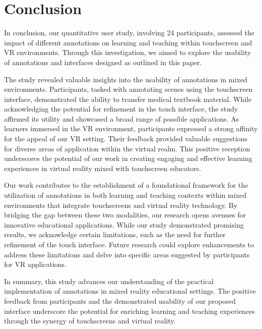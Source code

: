 \section{Conclusion}
In conclusion, our quantitative user study, involving 24 participants, assessed the impact of different annotations on learning and teaching within touchscreen and VR environments. Through this investigation, we aimed to explore the usability of annotations and interfaces designed as outlined in this paper.

The study revealed valuable insights into the usability of annotations in mixed environments. Participants, tasked with annotating scenes using the touchscreen interface, demonstrated the ability to transfer medical textbook material. While acknowledging the potential for refinement in the touch interface, the study affirmed its utility and showcased a broad range of possible applications. As learners immersed in the VR environment, participants expressed a strong affinity for the appeal of our VR setting. Their feedback provided valuable suggestions for diverse areas of application within the virtual realm. This positive reception underscores the potential of our work in creating engaging and effective learning experiences in virtual reality mixed with touchscreen educators.

Our work contributes to the establishment of a foundational framework for the utilization of annotations in both learning and teaching contexts within mixed environments that integrate touchscreens and virtual reality technology. By bridging the gap between these two modalities, our research opens avenues for innovative educational applications. While our study demonstrated promising results, we acknowledge certain limitations, such as the need for further refinement of the touch interface. Future research could explore enhancements to address these limitations and delve into specific areas suggested by participants for VR applications. 

In summary, this study advances our understanding of the practical implementation of annotations in mixed reality educational settings. The positive feedback from participants and the demonstrated usability of our proposed interface underscore the potential for enriching learning and teaching experiences through the synergy of touchscreens and virtual reality.

